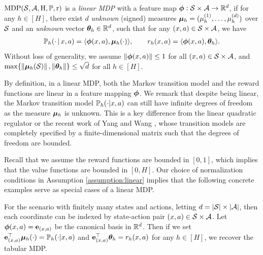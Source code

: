 \begin{assumption} \label{assumption:linear}
$\rm{MDP}(\cS, \cA, H, \P, r)$ is a \emph{linear MDP} with a feature map $\bphi: \cS \times \cA \rightarrow \R^d$, if for any $h\in [H]$, there exist $d$ \emph{unknown} (signed) measures $\bmu_h = (\mu_h^{(1)}, \ldots, \mu_h^{(d)})$ over $\cS$ and an \emph{unknown} vector $\btheta_h \in \R^d$, such that 
 for any $(x, a) \in \cS \times \cA$, we have 
\begin{align}\label{eq:linear_transition}  
\P_h(\cdot\given x, a) = \la\bphi(x, a), \bmu_h(\cdot)\ra, \qquad 
r_h(x, a) = \la\bphi(x, a), \btheta_h\ra.  
\end{align}
Without loss of generality, we assume $\norm{\bphi(x, a)} \le 1$ for all $(x,a ) \in \cS \times \cA$, and $\max\{\norm{\bmu_h(\cS)}, \norm{\btheta_h}\} \le \sqrt{d}$ for all $h \in [H]$.
\end{assumption}
By definition, in a linear MDP, both the Markov transition model and the reward functions are linear in a feature mapping $\bphi$. We remark that despite being linear, the Markov transition model $\P_h(\cdot|x, a)$ can still have infinite degrees of freedom as the measure $\bmu_h$ is unknown. This is a key difference from the linear quadratic regulator \citep{abbasi2011regret, dean2018regret, abeille2018improved, abbasi2019model, cohen2019learning} or the recent work of Yang and Wang \citep{yang2019reinforcement}, whose transition models are completely specified by a finite-dimensional matrix such that the degrees of freedom are bounded.  

Recall that we assume the reward functions are bounded in $[0,1]$, which implies that the value functions are bounded in $[0, H]$. Our choice of normalization conditions in Assumption \ref{assumption:linear} implies that the following concrete examples serve as special cases of a linear MDP.

\begin{example} \label{ex:tabular}For the scenario with finitely many states and actions, letting $d =  | \cS | \times | \cA|$, then each coordinate can be indexed by state-action pair $(x, a) \in \cS \times \cA$. Let $\bphi (x, a) = \e_{(x, a)}$ be the canonical basis in $\R^d$. Then if we set $\e_{(x, a)}\trans\bmu_h(\cdot) = \P_h(\cdot|x, a)$ and $\e_{(x, a)}\trans\btheta_h = r_h(x, a)$ for any $h \in [H]$, we recover the tabular MDP.
\end{example}

